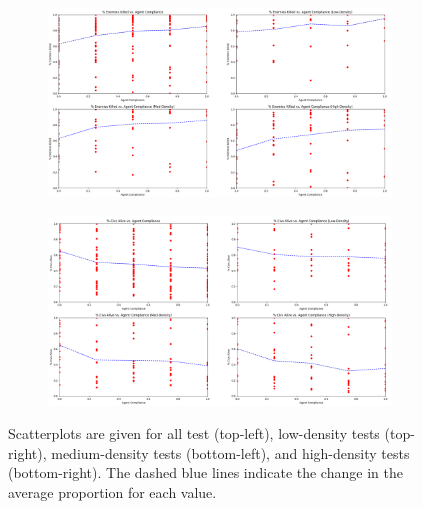 \documentclass[letterpaper,11pt]{article}
\begin{document}
	\begin{figure}[p]
		\begin{subfigure}[t]{\textwidth}
			\centering
			\includegraphics[width=\linewidth]{figures/ScatPlotsAgentEnemies}
			\label{fig:ScatPlotsAgentEnemies}
		\end{subfigure}
		\begin{subfigure}[b]{\textwidth}
			\centering
			\includegraphics[width=\linewidth]{figures/ScatPlotsAgentsCivs}
			\label{fig:ScatPlotsAgentsCivs}
		\end{subfigure}
		\caption{Scatterplots are given for all test (top-left), low-density tests (top-right), medium-density tests (bottom-left), and high-density tests (bottom-right). The dashed blue lines indicate the change in the average proportion for each value.}
		\label{fig:ScatPlotsAgents}
	\end{figure}
\end{document}
